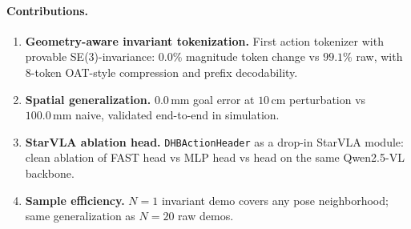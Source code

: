 \paragraph{Contributions.}
\begin{enumerate}
\item \textbf{Geometry-aware invariant tokenization.}
First action tokenizer with provable SE(3)-invariance: $0.0\%$ magnitude token change
vs $99.1\%$ raw, with 8-token OAT-style compression and prefix decodability.

\item \textbf{Spatial generalization.}
$0.0\,\text{mm}$ goal error at $10\,\text{cm}$ perturbation vs $100.0\,\text{mm}$ naive,
validated end-to-end in simulation.

\item \textbf{StarVLA ablation head.}
\texttt{DHBActionHeader} as a drop-in StarVLA module: clean ablation of FAST head
vs MLP head vs \dhb{} head on the same Qwen2.5-VL backbone.

\item \textbf{Sample efficiency.}
$N{=}1$ invariant demo covers any pose neighborhood;
same generalization as $N{=}20$ raw demos.
\end{enumerate}
